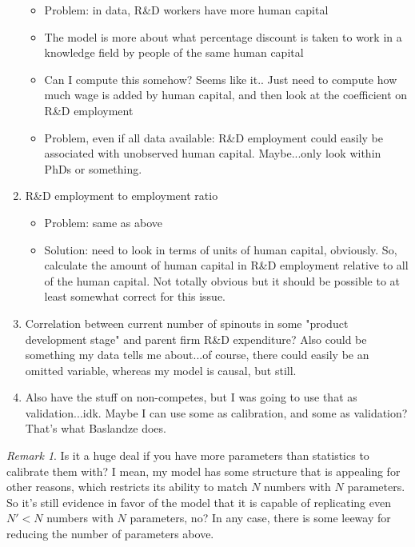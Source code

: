 \documentclass[12pt,english]{article}
\theoremstyle{remark}
\newtheorem{remark}{Remark}
\begin{document}
\begin{enumerate}
	\begin{itemize}
		\item Problem: in data, R\&D workers have more human capital
		\item The model is more about what percentage discount is taken to work in a knowledge field by people of the same human capital
		\item Can I compute this somehow? Seems like it.. Just need to compute how much wage is added by human capital, and then look at the coefficient on R\&D employment
		\item Problem, even if all data available: R\&D employment could easily be associated with unobserved human capital. Maybe...only look within PhDs or something. 
	\end{itemize}
	\item R\&D employment to employment ratio
	\begin{itemize}
		\item Problem: same as above
		\item Solution: need to look in terms of units of human capital, obviously. So, calculate the amount of human capital in R\&D employment relative to all of the human capital. Not totally obvious but it should be possible to at least somewhat correct for this issue. 
	\end{itemize}
	\item Correlation between current number of spinouts in some "product development stage" and parent firm R\&D expenditure? Also could be something my data tells me about...of course, there could easily be an omitted variable, whereas my model is causal, but still. 
	\item Also have the stuff on non-competes, but I was going to use that as validation...idk. Maybe I can use some as calibration, and some as validation? That's what Baslandze does. 
\end{enumerate}

\begin{remark}
	Is it a huge deal if you have more parameters than statistics to calibrate them with? I mean, my model has some structure that is appealing for other reasons, which restricts its ability to match $N$ numbers with $N$ parameters. So it's still evidence in favor of the model that it is capable of replicating even $N'<N$ numbers with $N$ parameters, no? In any case, there is some leeway for reducing the number of parameters above. 
\end{remark}
\end{document}
